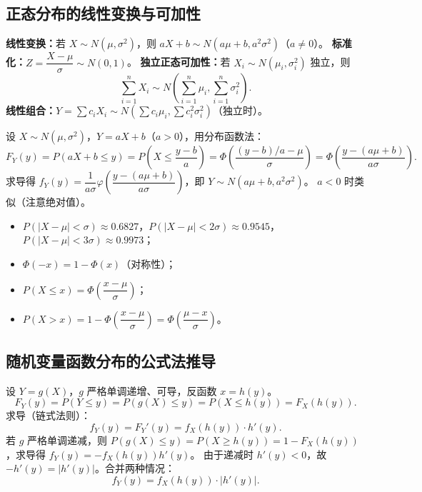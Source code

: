 \documentclass[11pt,a4paper]{article}
\begin{document}
\subsection{正态分布的线性变换与可加性}

\begin{variation}[正态分布的性质]
\textbf{线性变换：}若 $X\sim N(\mu,\sigma^2)$，则 $aX+b\sim N(a\mu+b, a^2\sigma^2)$（$a\neq 0$）。
\textbf{标准化：}$Z=\dfrac{X-\mu}{\sigma}\sim N(0,1)$。
\textbf{独立正态可加性：}若 $X_i\sim N(\mu_i,\sigma_i^2)$ 独立，则
\[
\sum_{i=1}^n X_i \sim N\!\left(\sum_{i=1}^n \mu_i, \sum_{i=1}^n \sigma_i^2\right).
\]
\textbf{线性组合：}$Y=\sum c_i X_i \sim N\!\left(\sum c_i\mu_i, \sum c_i^2\sigma_i^2\right)$（独立时）。
\end{variation}

\begin{derivation}[线性变换推导]
设 $X\sim N(\mu,\sigma^2)$，$Y=aX+b$（$a>0$），用分布函数法：
\[
F_Y(y) = P(aX+b\leq y) = P\!\left(X\leq \frac{y-b}{a}\right) = \Phi\!\left(\frac{(y-b)/a - \mu}{\sigma}\right) = \Phi\!\left(\frac{y-(a\mu+b)}{a\sigma}\right).
\]
求导得 $f_Y(y)=\dfrac{1}{a\sigma}\varphi\!\left(\dfrac{y-(a\mu+b)}{a\sigma}\right)$，即 $Y\sim N(a\mu+b, a^2\sigma^2)$。
$a<0$ 时类似（注意绝对值）。
\end{derivation}

\begin{keypoint}
\begin{itemize}[leftmargin=2em]
  \item $P(|X-\mu|<\sigma)\approx 0.6827$，$P(|X-\mu|<2\sigma)\approx 0.9545$，$P(|X-\mu|<3\sigma)\approx 0.9973$；
  \item $\Phi(-x)=1-\Phi(x)$（对称性）；
  \item $P(X\leq x)=\Phi\!\left(\dfrac{x-\mu}{\sigma}\right)$；
  \item $P(X>x)=1-\Phi\!\left(\dfrac{x-\mu}{\sigma}\right)=\Phi\!\left(\dfrac{\mu-x}{\sigma}\right)$。
\end{itemize}
\end{keypoint}

\subsection{随机变量函数分布的公式法推导}

\begin{derivation}[公式法 $f_Y(y)=f_X(h(y))|h'(y)|$ 的推导]
设 $Y=g(X)$，$g$ 严格单调递增、可导，反函数 $x=h(y)$。
\[
F_Y(y) = P(Y\leq y) = P(g(X)\leq y) = P(X\leq h(y)) = F_X(h(y)).
\]
求导（链式法则）：
\[
f_Y(y) = F_Y'(y) = f_X(h(y))\cdot h'(y).
\]
若 $g$ 严格单调递减，则 $P(g(X)\leq y)=P(X\geq h(y))=1-F_X(h(y))$，求导得 $f_Y(y)=-f_X(h(y))h'(y)$。
由于递减时 $h'(y)<0$，故 $-h'(y)=|h'(y)|$。合并两种情况：
\[
f_Y(y) = f_X(h(y))\cdot |h'(y)|.
\]
\end{derivation}
\end{document}
